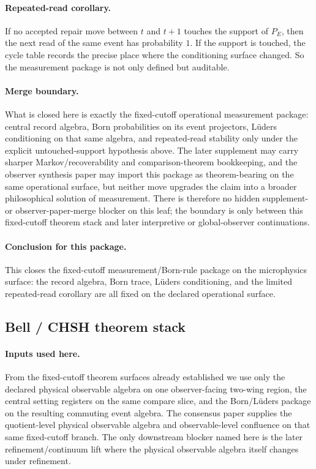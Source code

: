 \documentclass[11pt]{article}
\begin{document}
\paragraph{Repeated-read corollary.}
If no accepted repair move between $t$ and $t+1$ touches the support of $P_E$, then the next
read of the same event has probability $1$. If the support is touched, the cycle table records
the precise place where the conditioning surface changed. So the measurement package is not only
defined but auditable.

\paragraph{Merge boundary.}
What is closed here is exactly the fixed-cutoff operational measurement package: central record
algebra, Born probabilities on its event projectors, L\"uders conditioning on that same algebra,
and repeated-read stability only under the explicit untouched-support hypothesis above. The
later supplement may carry sharper Markov/recoverability and comparison-theorem bookkeeping, and
the observer synthesis paper may import this package as theorem-bearing on the same operational
surface, but neither move upgrades the claim into a broader philosophical solution of
measurement. There is therefore no hidden supplement- or observer-paper-merge blocker on this
leaf; the boundary is only between this fixed-cutoff theorem stack and later interpretive or
global-observer continuations.

\paragraph{Conclusion for this package.}
This closes the fixed-cutoff measurement/Born-rule package on the microphysics surface: the
record algebra, Born trace, L\"uders conditioning, and the limited repeated-read corollary are
all fixed on the declared operational surface.

\subsection{Bell / CHSH theorem stack}

\paragraph{Inputs used here.}
From the fixed-cutoff theorem surfaces already established we use only the declared physical
observable algebra on one observer-facing two-wing region, the central setting registers on the
same compare slice, and the Born/L\"uders package on the resulting commuting event algebra. The
consensus paper supplies the quotient-level physical observable algebra and observable-level
confluence on that same fixed-cutoff branch. The only downstream blocker named here is the later
refinement/continuum lift where the physical observable algebra itself changes under refinement.
\end{document}
